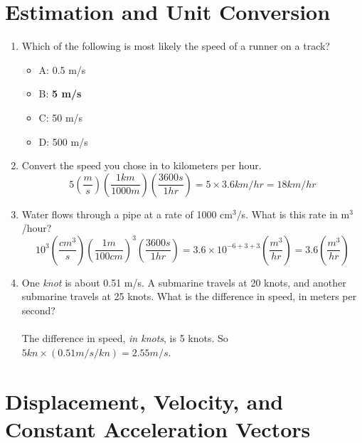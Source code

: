 \documentclass[10pt]{article}
\begin{document}
\maketitle

\section{Estimation and Unit Conversion}
\begin{enumerate}
\item Which of the following is most likely the speed of a runner on a track?
\begin{itemize}
\item A: 0.5 m/s
\item B: \textbf{5 m/s}
\item C: 50 m/s
\item D: 500 m/s
\end{itemize}
\item Convert the speed you chose in to kilometers per hour. \\
\begin{equation}
5 \left(\frac{m}{s}\right) \left(\frac{1 km}{1000 m}\right) \left(\frac{3600 s}{1 hr}\right) = 5 \times 3.6 km/hr = 18 km/hr
\end{equation}
\item Water flows through a pipe at a rate of 1000 cm$^3$/s.  What is this rate in m$^3$/hour? \\
\begin{equation}
10^3 \left(\frac{cm^3}{s}\right) \left(\frac{1 m}{100 cm}\right)^3 \left(\frac{3600 s}{1 hr}\right) = 3.6 \times 10^{-6+3+3} \left(\frac{m^3}{hr}\right) = 3.6 \left(\frac{m^3}{hr}\right) 
\end{equation}
\item One \textit{knot} is about 0.51 m/s.  A submarine travels at 20 knots, and another submarine travels at 25 knots.  What is the difference in speed, in meters per second? \\ \\
The difference in speed, \textit{in knots}, is 5 knots.  So $5 kn \times (0.51 m/s / kn) = 2.55 m/s$.
\end{enumerate}

\section{Displacement, Velocity, and Constant Acceleration Vectors}
\end{document}
